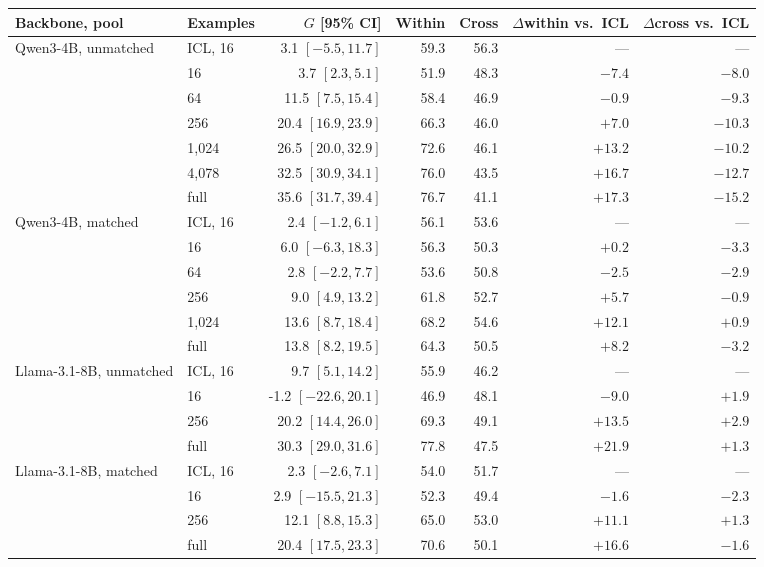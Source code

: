 \begin{tabular}{@{}llrrrrr@{}}
\toprule
Backbone, pool & Examples & $G$ [95\% CI] & Within & Cross & $\Delta$within vs.\ ICL & $\Delta$cross vs.\ ICL \\
\midrule
Qwen3-4B, unmatched & ICL, 16 & 3.1 $[-5.5,11.7]$ & 59.3 & 56.3 & --- & --- \\
 & 16 & 3.7 $[2.3,5.1]$ & 51.9 & 48.3 & $-7.4$ & $-8.0$ \\
 & 64 & 11.5 $[7.5,15.4]$ & 58.4 & 46.9 & $-0.9$ & $-9.3$ \\
 & 256 & 20.4 $[16.9,23.9]$ & 66.3 & 46.0 & $+7.0$ & $-10.3$ \\
 & 1,024 & 26.5 $[20.0,32.9]$ & 72.6 & 46.1 & $+13.2$ & $-10.2$ \\
 & 4,078 & 32.5 $[30.9,34.1]$ & 76.0 & 43.5 & $+16.7$ & $-12.7$ \\
 & full & 35.6 $[31.7,39.4]$ & 76.7 & 41.1 & $+17.3$ & $-15.2$ \\
\midrule
Qwen3-4B, matched & ICL, 16 & 2.4 $[-1.2,6.1]$ & 56.1 & 53.6 & --- & --- \\
 & 16 & 6.0 $[-6.3,18.3]$ & 56.3 & 50.3 & $+0.2$ & $-3.3$ \\
 & 64 & 2.8 $[-2.2,7.7]$ & 53.6 & 50.8 & $-2.5$ & $-2.9$ \\
 & 256 & 9.0 $[4.9,13.2]$ & 61.8 & 52.7 & $+5.7$ & $-0.9$ \\
 & 1,024 & 13.6 $[8.7,18.4]$ & 68.2 & 54.6 & $+12.1$ & $+0.9$ \\
 & full & 13.8 $[8.2,19.5]$ & 64.3 & 50.5 & $+8.2$ & $-3.2$ \\
\midrule
Llama-3.1-8B, unmatched & ICL, 16 & 9.7 $[5.1,14.2]$ & 55.9 & 46.2 & --- & --- \\
 & 16 & -1.2 $[-22.6,20.1]$ & 46.9 & 48.1 & $-9.0$ & $+1.9$ \\
 & 256 & 20.2 $[14.4,26.0]$ & 69.3 & 49.1 & $+13.5$ & $+2.9$ \\
 & full & 30.3 $[29.0,31.6]$ & 77.8 & 47.5 & $+21.9$ & $+1.3$ \\
\midrule
Llama-3.1-8B, matched & ICL, 16 & 2.3 $[-2.6,7.1]$ & 54.0 & 51.7 & --- & --- \\
 & 16 & 2.9 $[-15.5,21.3]$ & 52.3 & 49.4 & $-1.6$ & $-2.3$ \\
 & 256 & 12.1 $[8.8,15.3]$ & 65.0 & 53.0 & $+11.1$ & $+1.3$ \\
 & full & 20.4 $[17.5,23.3]$ & 70.6 & 50.1 & $+16.6$ & $-1.6$ \\
\bottomrule
\end{tabular}
